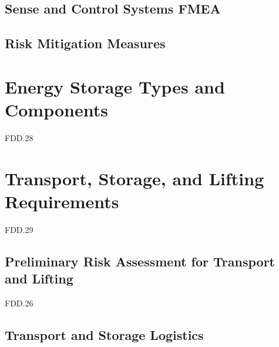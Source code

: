 \subsection{Sense and Control Systems FMEA}

\subsection{Risk Mitigation Measures}


\section{ Energy Storage Types and Components}
FDD.28

\section{Transport, Storage, and Lifting Requirements}
FDD.29 
\subsection{Preliminary Risk Assessment for Transport and Lifting}
FDD.26 

\subsection{Transport and Storage Logistics}


\newpage
{}
 {
    \newpage
}